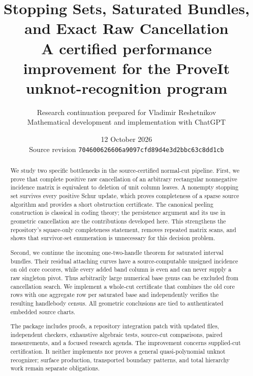 \documentclass[11pt,letterpaper]{article}
\title{\textcolor{ink}{Stopping Sets, Saturated Bundles,\\and Exact Raw Cancellation}\\[.5em]
\large A certified performance improvement for the ProveIt unknot-recognition program}
\author{Research continuation prepared for Vladimir Reshetnikov\\
\small Mathematical development and implementation with ChatGPT}
\date{12 October 2026\\\small Source revision \texttt{704600626606a9097cfd89d4e3d2bbc63c8dd1cb}}
\theoremstyle{definition}
\theoremstyle{remark}
\begin{document}
\maketitle
\begin{abstract}
We study two specific bottlenecks in the source-certified normal-cut pipeline.
First, we prove that complete positive raw cancellation of an arbitrary
rectangular nonnegative incidence matrix is equivalent to deletion of unit
column leaves. A nonempty stopping set survives every positive Schur update,
which proves completeness of a sparse source algorithm and provides a short
obstruction certificate. The canonical peeling construction is classical in
coding theory; the persistence argument and its use in geometric cancellation
are the contributions developed here. This strengthens the repository's
square-only completeness statement, removes repeated matrix scans, and shows
that survivor-set enumeration is unnecessary for this decision problem.

Second, we continue the incoming one-two-handle theorem for saturated interval
bundles. Their residual attaching curves have a source-computable unsigned
incidence on old core cocores, while every added band column is even and can
never supply a raw singleton pivot. Thus arbitrarily large numerical base
genus can be excluded from cancellation search. We implement a whole-cut
certificate that combines the old core rows with one aggregate row per
saturated base and independently verifies the resulting handlebody census.
All geometric conclusions are tied to authenticated embedded source charts.

The package includes proofs, a repository integration patch with updated files,
independent checkers, exhaustive algebraic tests, source-cut comparisons,
paired measurements, and a focused research agenda. The improvement concerns
supplied-cut certification. It neither implements nor proves a general
quasi-polynomial unknot recognizer; surface production, transported boundary
patterns, and total hierarchy work remain separate obligations.
\end{abstract}
\clearpage
\tableofcontents
\clearpage









\clearpage

\appendix

\end{document}
